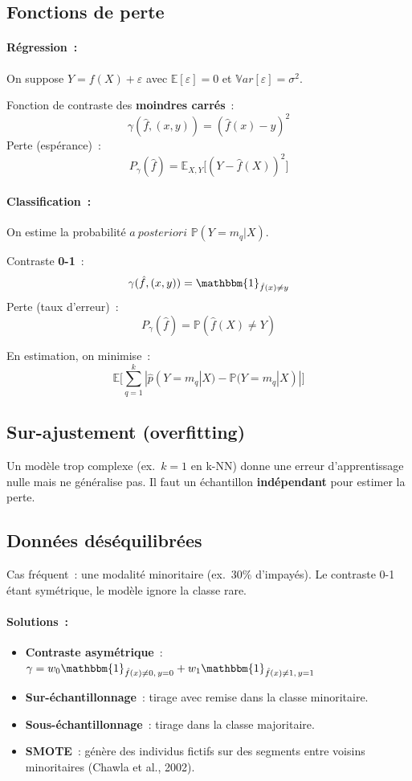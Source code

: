 \documentclass[a4paper,11pt]{article}
\theoremstyle{definition}
\theoremstyle{remark}
\begin{document}
\subsection{Fonctions de perte}

\paragraph{R\'egression~:} On suppose $Y = f(X) + \varepsilon$
avec $\mathbb{E}[\varepsilon]=0$ et $\mathbb{V}ar[\varepsilon]=\sigma^2$.

Fonction de contraste des \textbf{moindres carr\'es}~:
\[
\gamma(\hat{f}, (x, y)) = (\hat{f}(x) - y)^2
\]
Perte (esp\'erance)~:
\[
P_\gamma(\hat{f}) = \mathbb{E}_{X,Y}\big[ (Y - \hat{f}(X))^2 \big]
\]

\paragraph{Classification~:} On estime la probabilit\'e
$a~posteriori$ $\mathbb{P}(Y=m_q|X)$.

Contraste \textbf{0-1}~:
\[
\gamma(\hat{f}, (x, y)) = \mathbbm{1}_{\hat{f}(x) \neq y}
\]
Perte (taux d'erreur)~:
\[
P_\gamma(\hat{f}) = \mathbb{P}(\hat{f}(X) \neq Y)
\]

\noindent En estimation, on minimise~:
\[
\mathbb{E}\Big[ \sum_{q=1}^k |\hat{p}(Y=m_q|X) - \mathbb{P}(Y=m_q|X)| \Big]
\]

\subsection{Sur-ajustement (overfitting)}

Un mod\`ele trop complexe (ex.~$k=1$ en k-NN) donne une erreur
d'apprentissage nulle mais ne g\'en\'eralise pas. Il faut un
\'echantillon \textbf{ind\'ependant} pour estimer la perte.

\subsection{Donn\'ees d\'es\'equilibr\'ees}

Cas fr\'equent~: une modalit\'e minoritaire (ex.~30\% d'impay\'es).
Le contraste 0-1 \'etant sym\'etrique, le mod\`ele ignore la
classe rare.

\paragraph{Solutions~:}
\begin{itemize}
  \item \textbf{Contraste asym\'etrique}~:
    $\gamma = w_0 \mathbbm{1}_{\hat{f}(x)\neq0,\,y=0}
      + w_1 \mathbbm{1}_{\hat{f}(x)\neq1,\,y=1}$
  \item \textbf{Sur-\'echantillonnage}~: tirage avec remise dans la
    classe minoritaire.
  \item \textbf{Sous-\'echantillonnage}~: tirage dans la classe
    majoritaire.
  \item \textbf{SMOTE}~: g\'en\`ere des individus fictifs sur des
    segments entre voisins minoritaires (Chawla et al., 2002).
\end{itemize}
\end{document}
